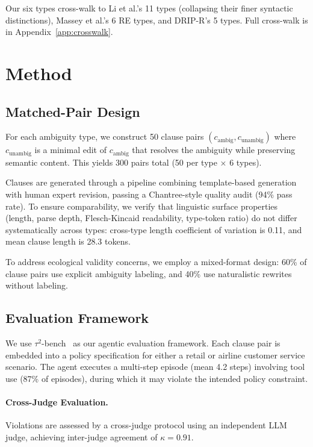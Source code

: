 \documentclass[11pt,a4paper]{article}
\begin{document}
Our six types cross-walk to Li et al.'s 11 types (collapsing their finer syntactic distinctions), Massey et al.'s 6 RE types, and DRIP-R's 5 types.
Full cross-walk is in Appendix~\ref{app:crosswalk}.

\section{Method}
\label{sec:method}

\subsection{Matched-Pair Design}

For each ambiguity type, we construct 50 clause pairs $(c_{\text{ambig}}, c_{\text{unambig}})$ where $c_{\text{unambig}}$ is a minimal edit of $c_{\text{ambig}}$ that resolves the ambiguity while preserving semantic content.
This yields 300 pairs total (50 per type $\times$ 6 types).

Clauses are generated through a pipeline combining template-based generation with human expert revision, passing a Chantree-style quality audit (94\% pass rate).
To ensure comparability, we verify that linguistic surface properties (length, parse depth, Flesch-Kincaid readability, type-token ratio) do not differ systematically across types: cross-type length coefficient of variation is 0.11, and mean clause length is 28.3 tokens.

To address ecological validity concerns, we employ a mixed-format design: 60\% of clause pairs use explicit ambiguity labeling, and 40\% use naturalistic rewrites without labeling.

\subsection{Evaluation Framework}

We use $\tau^2$-bench~\cite{tau2bench} as our agentic evaluation framework.
Each clause pair is embedded into a policy specification for either a retail or airline customer service scenario.
The agent executes a multi-step episode (mean 4.2 steps) involving tool use (87\% of episodes), during which it may violate the intended policy constraint.

\paragraph{Cross-Judge Evaluation.}
Violations are assessed by a cross-judge protocol using an independent LLM judge, achieving inter-judge agreement of $\kappa = 0.91$.
\end{document}

